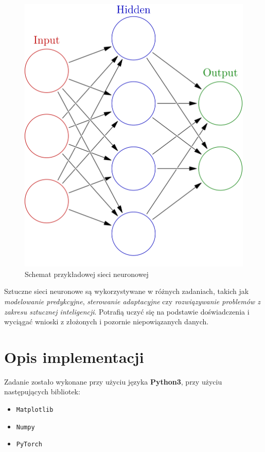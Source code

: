 \documentclass{classrep}
\begin{document}
\begin{figure}[h!]
	\centering
	\includegraphics[scale=0.2]{nn.png}
	\caption{Schemat przykładowej sieci neuronowej}
	\label{fig:nn}
\end{figure}

Sztuczne sieci neuronowe są wykorzystywane w różnych zadaniach, takich jak \textit{modelowanie predykcyjne}, \textit{sterowanie adaptacyjne} czy \textit{rozwiązywanie problemów z zakresu sztucznej inteligencji}. Potrafią uczyć się na podstawie doświadczenia i wyciągać wnioski z złożonych i pozornie niepowiązanych danych.

\section{Opis implementacji}
Zadanie zostało wykonane przy użyciu języka \textbf{Python3}, przy użyciu następujących bibliotek:
\begin{itemize}
	\item{\texttt{Matplotlib}}
	\item{\texttt{Numpy}}
	\item{\texttt{PyTorch}}
\end{itemize}
\end{document}
